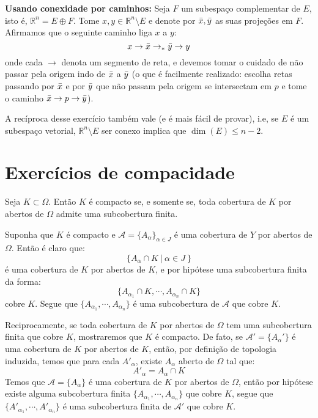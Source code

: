 \begin{dem}
\begin{oobs}
    \end{oobs}
\textbf{Usando conexidade por caminhos:} Seja $F$ um subespaço complementar de $E$, isto é, $\mathbb{R}^n =  E \oplus F$. Tome $x, y \in \mathbb{R}^n \setminus E$ e denote por $\Bar{x}, \Bar{y}$ as suas projeções em $F$. Afirmamos que o seguinte caminho liga $x$ a $y$: $$x \to \Bar{x} \to_{*} \Bar{y} \to y$$ onde cada $\to$ denota um segmento de reta, e devemos tomar o cuidado de não passar pela origem indo de $\Bar{x}$ a $\Bar{y}$ (o que é facilmente realizado: escolha retas passando por $\Bar{x}$ e por $\Bar{y}$ que não passam pela origem se intersectam em $p$ e tome o caminho $\Bar{x} \to p \to \Bar{y}$).
\begin{oobs}
A recíproca desse exercício também vale (e é mais fácil de provar), i.e, se $E$ é um subespaço vetorial, $\mathbb{R}^n \setminus E$ ser conexo implica que $\dim(E) \leq n -2$.
\end{oobs}
\end{dem}
\section{Exercícios de compacidade}
\begin{Mybox}
Seja $K \subset \Omega$. Então $K$ é compacto se, e somente se, toda cobertura de $K$ por abertos de $\Omega$ admite uma subcobertura finita.
\vspace{-.4cm}
\end{Mybox}
\vspace{-.5cm}
\begin{dem}
Suponha que $K$ é compacto e $\mathscr{A} = \{A_{\alpha}\}_{\alpha \in J}$ é uma cobertura de $Y$ por abertos de $\Omega$. Então é claro que: $$\{A_{\alpha} \cap K \ \vert \ \alpha \in J \ \}$$ é uma cobertura de $K$ por abertos de $K$, e por hipótese uma subcobertura finita da forma: $$\{A_{\alpha_1} \cap K, \cdots, A_{\alpha_n} \cap K \}$$ cobre $K$. Segue que $\{A_{\alpha_1}, \cdots, A_{\alpha_n} \}$ é uma subcobertura de $\mathscr{A}$ que cobre $K$. 
    \par 
    Reciprocamente, se toda cobertura de $K$ por abertos de $\Omega$ tem uma subcobertura finita que cobre $K$, mostraremos que $K$ é compacto. De fato, se $\mathscr{A}' = \{A_{\alpha}' \}$ é uma cobertura de $K$ por abertos de $K$, então, por definição de topologia induzida, temos que para cada $A'_{\alpha}$, existe $A_\alpha$ aberto de $\Omega$ tal que: $$A'_{\alpha} = A_\alpha \cap K$$ Temos que $\mathscr{A} = \{A_\alpha \}$ é uma cobertura de $K$ por abertos de $\Omega$, então por hipótese existe alguma subcobertura finita $\{A_{\alpha_1}, \cdots, A_{\alpha_n} \}$ que cobre $K$, segue que $\{A'_{\alpha_1}, \cdots, A'_{\alpha_n} \}$ é uma subcobertura finita de $\mathscr{A}'$ que cobre $K$.
\end{dem}


